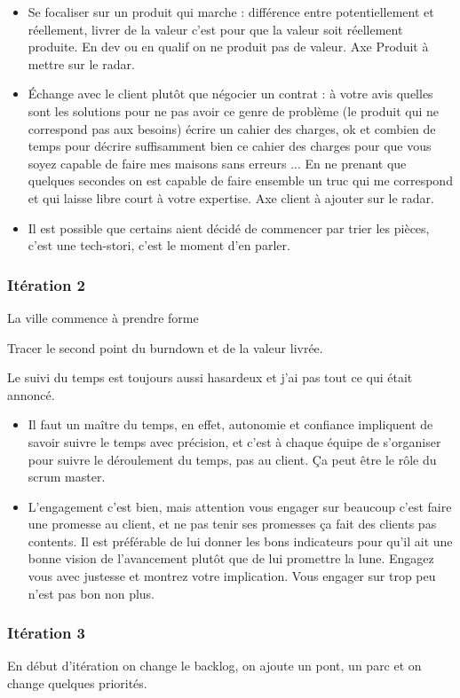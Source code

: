 \documentclass[a4paper,12pt]{article}
\begin{document}
\begin{itemize}
  \item Se focaliser sur un produit qui marche : différence entre potentiellement et réellement, livrer de la valeur c'est pour que la valeur soit réellement produite. En dev ou en qualif on ne produit pas de valeur. Axe Produit à mettre sur le radar.
  \item Échange avec le client plutôt que négocier un contrat : à votre avis quelles sont les solutions pour ne pas avoir ce genre de problème (le produit qui ne correspond pas aux besoins) écrire un cahier des charges, ok et combien de temps pour décrire suffisamment bien ce cahier des charges pour que vous soyez capable de faire mes maisons sans erreurs ... En ne prenant que quelques secondes on est capable de faire ensemble un truc qui me correspond et qui laisse libre court à votre expertise. Axe client à ajouter sur le radar.
  \item Il est possible que certains aient décidé de commencer par trier les pièces, c'est une tech-stori, c'est le moment d'en parler.
\end{itemize}

\subsubsection{Itération 2}
La ville commence à prendre forme

Tracer le second point du burndown et de la valeur livrée.

Le suivi du temps est toujours aussi hasardeux et j'ai pas tout ce qui était annoncé.

\begin{itemize}
  \item Il faut un maître du temps, en effet, autonomie et confiance impliquent de savoir suivre le temps avec précision, et c'est à chaque équipe de s'organiser pour suivre le déroulement du temps, pas au client. Ça peut être le rôle du scrum master.
  \item L'engagement c'est bien, mais attention vous engager sur beaucoup c'est faire une promesse au client, et ne pas tenir ses promesses ça fait des clients pas contents. Il est préférable de lui donner les bons indicateurs pour qu'il ait une bonne vision de l'avancement plutôt que de lui promettre la lune. Engagez vous avec justesse et montrez votre implication. Vous engager sur trop peu n'est pas bon non plus.
\end{itemize}

\subsubsection{Itération 3}
En début d'itération on change le backlog, on ajoute un pont, un parc et on change quelques priorités.
\end{document}
